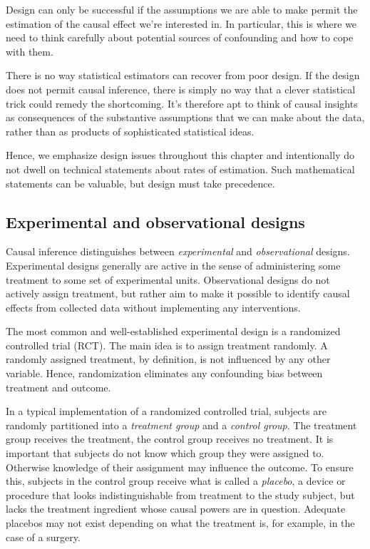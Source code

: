 \documentclass{tufte-book}
\begin{document}
Design can only be successful if the assumptions we are able to make
permit the estimation of the causal effect we're interested in. In
particular, this is where we need to think carefully about potential
sources of confounding and how to cope with them.

There is no way statistical estimators can recover from poor design. If
the design does not permit causal inference, there is simply no way that
a clever statistical trick could remedy the shortcoming. It's therefore
apt to think of causal insights as consequences of the substantive
assumptions that we can make about the data, rather than as products of
sophisticated statistical ideas.

Hence, we emphasize design issues throughout this chapter and
intentionally do not dwell on technical statements about rates of
estimation. Such mathematical statements can be valuable, but design
must take precedence.

\hypertarget{experimental-and-observational-designs}{%
\subsection{Experimental and observational
designs}\label{experimental-and-observational-designs}}

Causal inference distinguishes between \emph{experimental} and
\emph{observational} designs. Experimental designs generally are active
in the sense of administering some treatment to some set of experimental
units. Observational designs do not actively assign treatment, but
rather aim to make it possible to identify causal effects from collected
data without implementing any interventions.

The most common and well-established experimental design is a randomized
controlled trial (RCT). The main idea is to assign treatment randomly. A
randomly assigned treatment, by definition, is not influenced by any
other variable. Hence, randomization eliminates any confounding bias
between treatment and outcome.

In a typical implementation of a randomized controlled trial, subjects
are randomly partitioned into a \emph{treatment group} and a
\emph{control group}. The treatment group receives the treatment, the
control group receives no treatment. It is important that subjects do
not know which group they were assigned to. Otherwise knowledge of their
assignment may influence the outcome. To ensure this, subjects in the
control group receive what is called a \emph{placebo}, a device or
procedure that looks indistinguishable from treatment to the study
subject, but lacks the treatment ingredient whose causal powers are in
question. Adequate placebos may not exist depending on what the
treatment is, for example, in the case of a surgery.
\end{document}
